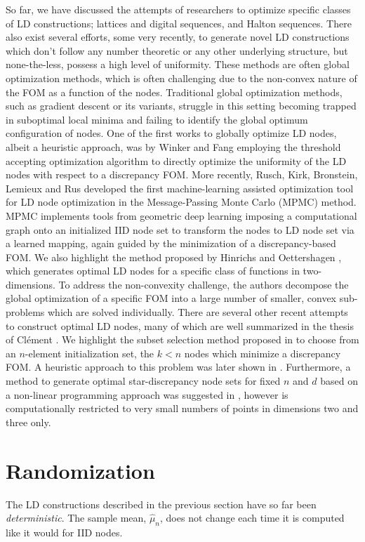 \documentclass{svproc}
\newcounter{algorithm}%
\begin{document}
So far, we have discussed the attempts of researchers to optimize specific classes of LD constructions; lattices and digital sequences, and Halton sequences.  There also exist several efforts, some very recently, to generate novel LD constructions which don't follow any number theoretic or any other underlying structure, but none-the-less, possess a high level of uniformity. These methods are often global optimization methods, which is often challenging due to the non-convex nature of the FOM as a function of the nodes. Traditional global optimization methods, such as gradient descent or its variants, struggle in this setting becoming trapped in suboptimal local minima and failing to identify the global optimum configuration of nodes. One of the first works to globally optimize LD nodes, albeit a heuristic approach, was by Winker and Fang \cite{WinFan97b} employing the threshold accepting optimization algorithm to directly optimize the uniformity of the LD nodes with respect to a discrepancy FOM. More recently, Rusch, Kirk, Bronstein, Lemieux and Rus \cite{ruschkirk24} developed the first machine-learning assisted optimization tool for LD node optimization in the Message-Passing Monte Carlo (MPMC) method. MPMC implements tools from geometric deep learning imposing a computational graph onto an initialized IID node set to transform the nodes to LD node set via a learned mapping, again guided by the minimization of a discrepancy-based FOM. We also highlight the method proposed by Hinrichs and Oettershagen \cite{hinoet16}, which generates optimal LD nodes for a specific class of functions in two-dimensions. To address the non-convexity challenge, the authors decompose the global optimization of a specific FOM into a large number of smaller, convex sub-problems which are solved individually. There are several other recent attempts to construct optimal LD nodes, many of which are well summarized in the thesis of Cl\'{e}ment \cite{clethesis24}. We highlight the subset selection method proposed in \cite{cle22} to choose from an $n$-element initialization set, the $k<n$ nodes which minimize a discrepancy FOM. A heuristic approach to this problem was later shown in \cite{cle24}. Furthermore, a method to generate optimal star-discrepancy node sets for fixed $n$ and $d$ based on a non-linear programming approach was suggested in \cite{cle24}, however is computationally restricted to very small numbers of points in dimensions two and three only.




\section{Randomization} \label{sec:random}
The LD constructions described in the previous section have so far been \emph{deterministic}. The sample mean, $\hat{\mu}_n$, does not change each time it is computed like it would for IID nodes.
\end{document}

